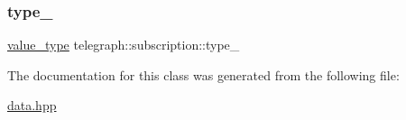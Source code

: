 \mbox{\label{classtelegraph_1_1subscription_a1f168a6bb8f030ebc870e1a702192139}} 
\subsubsection{\texorpdfstring{type\+\_\+}{type\_}}
{\footnotesize\ttfamily \hyperlink{classtelegraph_1_1value__type}{value\+\_\+type} telegraph\+::subscription\+::type\+\_\+\hspace{0.3cm}{\ttfamily [protected]}}



The documentation for this class was generated from the following file\+:\begin{DoxyCompactItemize}
\item 
\hyperlink{data_8hpp}{data.\+hpp}\end{DoxyCompactItemize}
